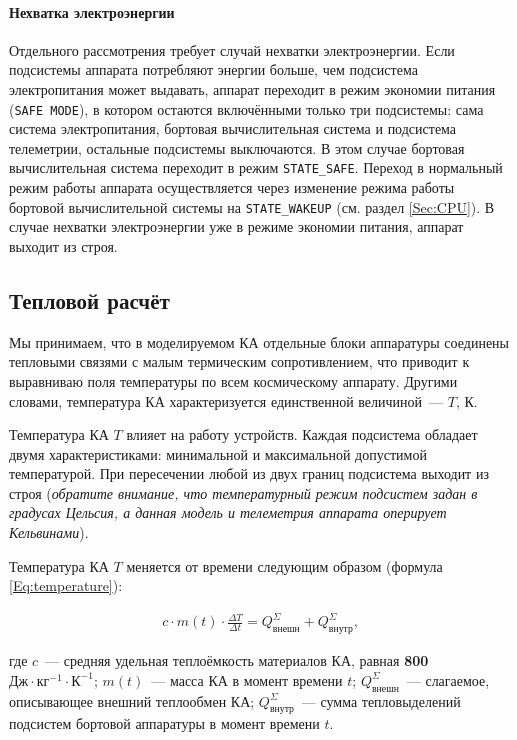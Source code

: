 \documentclass[12pt,a4paper]{article}
\begin{document}
\paragraph{Нехватка электроэнергии}

Отдельного рассмотрения требует случай нехватки электроэнергии. Если подсистемы аппарата
потребляют энергии больше, чем подсистема электропитания может выдавать, аппарат переходит
в режим экономии питания (\verb'SAFE MODE'), в котором остаются включёнными только три
подсистемы: сама система электропитания, бортовая вычислительная система и подсистема
телеметрии, остальные подсистемы выключаются. В этом случае бортовая вычислительная
система переходит в режим \verb'STATE_SAFE'. Переход в нормальный режим работы аппарата
осуществляется через изменение режима работы бортовой вычислительной системы на
\verb'STATE_WAKEUP' (см. раздел \ref{Sec:CPU}). В случае нехватки электроэнергии уже в режиме экономии
питания, аппарат выходит из строя.

\subsection{Тепловой расчёт}
\label{Sec:Heat}

Мы принимаем, что в моделируемом КА отдельные блоки аппаратуры соединены тепловыми связями
с малым термическим сопротивлением, что приводит к выравниваю поля температуры по всем
космическому аппарату. Другими словами, температура КА характеризуется единственной
величиной~--– $T$, К.

Температура КА $T$ влияет на работу устройств. Каждая подсистема обладает двумя
характеристиками: минимальной и максимальной допустимой температурой. При пересечении
любой из двух границ подсистема выходит из строя (\emph{обратите внимание, что температурный
режим подсистем задан в градусах Цельсия, а данная модель и телеметрия аппарата оперирует
Кельвинами}).

Температура КА $T$ меняется от времени следующим образом (формула \ref{Eq:temperature}):

\begin{eqnarray}
c \cdot m(t) \cdot \frac{\Delta T}{\Delta t} = Q^{\Sigma}_{\text{внешн}} + Q^{\Sigma}_{\text{внутр}}, \label{Eq:temperature}
\end{eqnarray}

где $c$~--- средняя удельная теплоёмкость материалов КА, равная \textbf{800 $\text{Дж}
  \cdot \text{кг}^{-1} \cdot \text{К}^{-1}$}; $m(t)$~--– масса КА в момент времени $t$;
$Q^{\Sigma}_{\text{внешн}}$~--- слагаемое, описывающее внешний теплообмен КА;
$Q^{\Sigma}_{\text{внутр}}$~--– сумма тепловыделений подсистем бортовой аппаратуры в
момент времени $t$.
\end{document}
